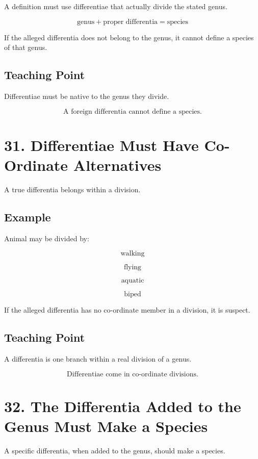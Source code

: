 \documentclass[12pt]{article}
\begin{document}
A definition must use differentiae that actually divide the stated genus.

\[
\text{genus} + \text{proper differentia} = \text{species}
\]

If the alleged differentia does not belong to the genus, it cannot define a
species of that genus.

\subsection*{Teaching Point}

Differentiae must be native to the genus they divide.

\[
\boxed{
\text{A foreign differentia cannot define a species.}
}
\]

\section*{31. Differentiae Must Have Co-Ordinate Alternatives}

A true differentia belongs within a division.

\subsection*{Example}

Animal may be divided by:

\[
\text{walking}
\]

\[
\text{flying}
\]

\[
\text{aquatic}
\]

\[
\text{biped}
\]

If the alleged differentia has no co-ordinate member in a division, it is
suspect.

\subsection*{Teaching Point}

A differentia is one branch within a real division of a genus.

\[
\boxed{
\text{Differentiae come in co-ordinate divisions.}
}
\]

\section*{32. The Differentia Added to the Genus Must Make a Species}

A specific differentia, when added to the genus, should make a species.
\end{document}
